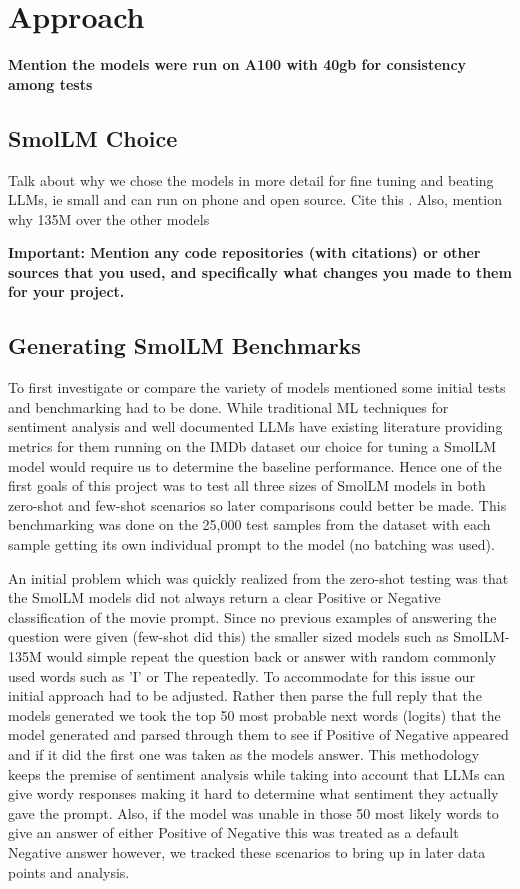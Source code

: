 \documentclass[10pt,twocolumn,letterpaper]{article}
\begin{document}
\section{Approach}

\textbf{Mention the models were run on A100 with 40gb for consistency among tests}


\subsection{SmolLM Choice}
Talk about why we chose the models in more detail for fine tuning and beating LLMs, ie small and can run on phone and open source. Cite this \cite{hf-smollm-usecase}.
Also, mention why 135M over the other models

\textbf{Important: Mention any code repositories (with citations) or other sources that you used, and specifically what changes you made to them for your project. }



\subsection{Generating SmolLM Benchmarks}
To first investigate or compare the variety of models mentioned some initial tests and benchmarking had to be done. While traditional ML techniques for sentiment analysis and well documented LLMs have existing literature providing metrics for them running on the IMDb dataset \cite{IMDB-dataset} our choice for tuning a SmolLM model would require us to determine the baseline performance. Hence one of the first goals of this project was to test all three sizes of SmolLM models in both zero-shot and few-shot scenarios so later comparisons could better be made. This benchmarking was done on the 25,000 test samples from the dataset with each sample getting its own individual prompt to the model (no batching was used). 

An initial problem which was quickly realized from the zero-shot testing was that the SmolLM models did not always return a clear Positive or Negative classification of the movie prompt. Since no previous examples of answering the question were given (few-shot did this) the smaller sized models such as SmolLM-135M would simple repeat the question back or answer with random commonly used words such as 'I' or The repeatedly. To accommodate for this issue our initial approach had to be adjusted. Rather then parse the full reply that the models generated we took the top 50 most probable next words (logits) that the model generated and parsed through them to see if Positive of Negative appeared and if it did the first one was taken as the models answer. This methodology keeps the premise of sentiment analysis while taking into account that LLMs can give wordy responses making it hard to determine what sentiment they actually gave the prompt. Also, if the model was unable in those 50 most likely words to give an answer of either Positive of Negative this was treated as a default Negative answer however, we tracked these scenarios to bring up in later data points and analysis. 
\end{document}
